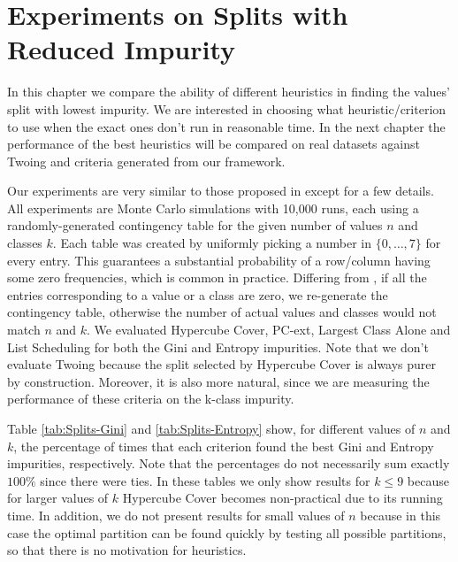 \newpage

\chapter{Experiments on Splits with Reduced Impurity}
\label{chap:experiments-splits}

In this chapter we compare the ability of different heuristics in finding the values' split with lowest impurity. We are interested in choosing what heuristic/criterion to use when the exact ones don't run in reasonable time. In the next chapter the performance of the best heuristics will be compared on real datasets against Twoing and criteria generated from our framework.

Our experiments are very similar to those proposed in \cite{journals/datamine/CoppersmithHH99} except for a few details. All experiments are Monte Carlo simulations with 10,000 runs, each using a randomly-generated contingency table for the given number of values $n$ and classes $k$. Each table  was created by uniformly picking a number in $\{0, \ldots, 7\}$ for every entry. This guarantees a substantial probability of a row/column having some zero frequencies, which is common in practice. Differing from  \cite{journals/datamine/CoppersmithHH99}, if all the entries corresponding to a value or a class are zero, we re-generate the contingency table, otherwise the number of actual values and classes would not match $n$ and $k$. We evaluated Hypercube Cover, PC-ext,
Largest Class Alone and List Scheduling for both the Gini and Entropy impurities. Note that we don't evaluate Twoing because the split selected by Hypercube Cover is always purer by construction. Moreover, it is also more natural, since we are measuring the performance of these criteria on the k-class impurity.

Table \ref{tab:Splits-Gini} and \ref{tab:Splits-Entropy} show, for different values of $n$ and $k$, the percentage of times that
each criterion found the best Gini and Entropy impurities, respectively. Note that the percentages do not necessarily sum exactly $100\%$ since
there were ties. In these tables we only show results for $k \leq 9$ because for larger values
of $k$ Hypercube Cover becomes non-practical due to its running time. In addition, we do not present results for small values of $n$ because in this
case the optimal  partition can be found quickly by testing all possible partitions, so that there is no motivation for heuristics.

